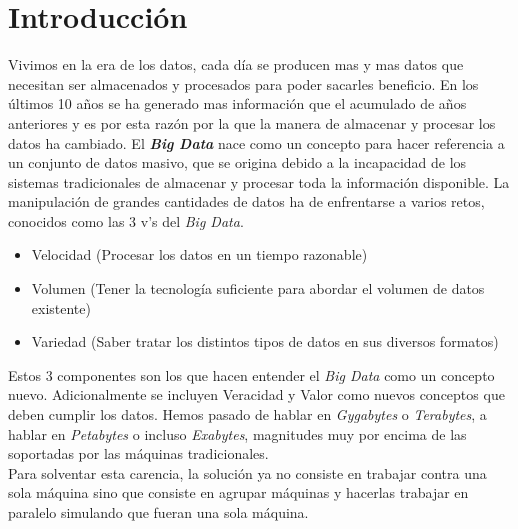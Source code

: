 \chapter*{Introducción}%

Vivimos en la era de los datos, cada día se producen mas y mas datos que
necesitan ser almacenados y procesados para poder sacarles beneficio.
En los últimos 10 años se ha generado mas información que el acumulado de años
anteriores y es por esta razón  por la que la manera de almacenar y procesar
los datos ha cambiado.
El \textbf{\textit{Big Data}}\label{big_data_def} nace como un concepto para hacer referencia a un 
conjunto de datos masivo, que se origina debido a la incapacidad de los sistemas tradicionales 
de almacenar y procesar toda la información disponible.
La manipulación de grandes cantidades de datos ha de enfrentarse a varios
retos, conocidos como las 3 v's del \textit{Big Data}.
\begin{itemize}
  \item Velocidad (Procesar los datos en un tiempo razonable)
  \item Volumen (Tener la tecnología suficiente para abordar el volumen de datos existente)
  \item Variedad (Saber tratar los distintos tipos de datos en sus diversos formatos)
\end{itemize}
Estos 3 componentes son los que hacen entender el \textit{Big Data} como un 
concepto nuevo. Adicionalmente se incluyen Veracidad y Valor como nuevos conceptos que deben cumplir los datos.
Hemos pasado de hablar en \textit{Gygabytes} o \textit{Terabytes}, a hablar 
en \textit{Petabytes} o incluso \textit{Exabytes}, magnitudes muy por encima de las soportadas 
por las máquinas tradicionales.\\
Para solventar esta carencia, la solución ya no consiste en trabajar contra una sola máquina
sino que consiste en agrupar máquinas y hacerlas trabajar en paralelo simulando que fueran una sola máquina.


